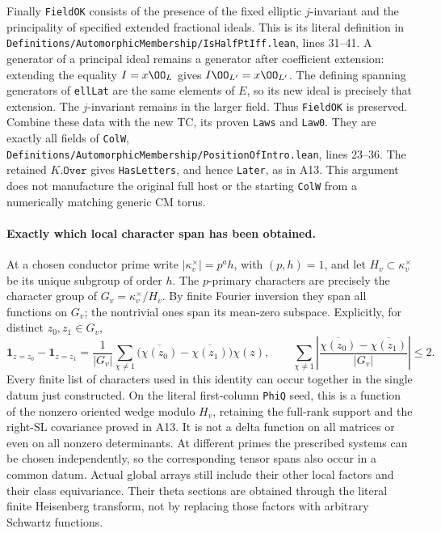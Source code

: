 Finally \texttt{FieldOK} consists of the presence of the fixed
elliptic $j$-invariant and the principality of specified extended
fractional ideals.  This is its literal definition in
\texttt{Definitions/AutomorphicMembership/IsHalfPtIff.lean},
lines 31--41.  A generator of a principal ideal remains a generator
after coefficient extension: extending the equality
$I=x\OO_L$ gives $I\OO_{L'}=x\OO_{L'}$.  The defining spanning
generators of \texttt{ellLat} are the same elements of $E$, so its
new ideal is precisely that extension.  The $j$-invariant remains
in the larger field.  Thus \texttt{FieldOK} is preserved.
Combine these data with the new TC, its proven \texttt{Laws} and
\texttt{Law0}.  They are exactly all fields of \texttt{ColW},
\texttt{Definitions/AutomorphicMembership/PositionOfIntro.lean},
lines 23--36.  The retained $K.\texttt{Over}$ gives
\texttt{HasLetters}, and hence \texttt{Later}, as in A13.
This argument does not manufacture the original full host or
the starting \texttt{ColW} from a numerically matching generic CM torus.

\paragraph{Exactly which local character span has been obtained.}
At a chosen conductor prime write
$|\kappa_v^\times|=p^a h$, with $(p,h)=1$, and let
$H_v\subset\kappa_v^\times$ be its unique subgroup of order $h$.
The $p$-primary characters are precisely the character group of
$G_v=\kappa_v^\times/H_v$.  By finite Fourier inversion they span
all functions on $G_v$; the nontrivial ones span its mean-zero
subspace.  Explicitly, for distinct $z_0,z_1\in G_v$,
\[
 \mathbf1_{z=z_0}-\mathbf1_{z=z_1}
  =\frac1{|G_v|}\sum_{\chi\ne1}
       \bigl(\overline{\chi(z_0)}-\overline{\chi(z_1)}\bigr)\chi(z),
 \qquad
 \sum_{\chi\ne1}
   \left|\frac{\overline{\chi(z_0)}-\overline{\chi(z_1)}}{|G_v|}\right|
   \leq2.
 \tag{A14f}
\]
Every finite list of characters used in this identity can occur
together in the single datum just constructed.  On the literal
first-column \texttt{PhiQ} seed, this is a function of the
nonzero oriented wedge modulo $H_v$, retaining the full-rank support
and the right-$\mathrm{SL}$ covariance proved in A13.  It is not a
delta function on all matrices or even on all nonzero determinants.
At different primes the prescribed systems can be chosen independently,
so the corresponding tensor spans also occur in a common datum.
Actual global arrays still include their other local factors and
their class equivariance.  Their theta sections are obtained through
the literal finite Heisenberg transform, not by replacing those
factors with arbitrary Schwartz functions.

